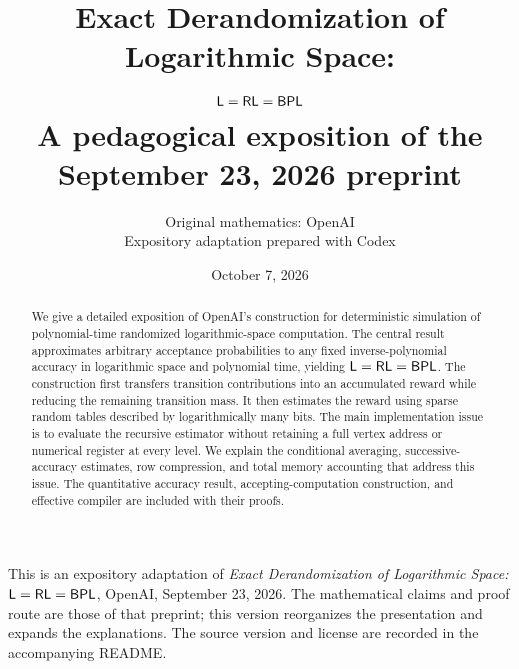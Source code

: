 \documentclass[11pt]{article}
\title{Exact Derandomization of Logarithmic Space:\protect\\
 $\mathsf L=\mathsf{RL}=\mathsf{BPL}$\protect\\[6pt]
 \large A pedagogical exposition of the September 23, 2026 preprint}
\author{Original mathematics: OpenAI\\[3pt]\normalsize Expository adaptation prepared with Codex}
\date{October 7, 2026}
\begin{document}
\maketitle
\begin{abstract}
We give a detailed exposition of OpenAI's construction for deterministic simulation of polynomial-time randomized logarithmic-space computation. The central result approximates arbitrary acceptance probabilities to any fixed inverse-polynomial accuracy in logarithmic space and polynomial time, yielding $\mathsf L=\mathsf{RL}=\mathsf{BPL}$. The construction first transfers transition contributions into an accumulated reward while reducing the remaining transition mass. It then estimates the reward using sparse random tables described by logarithmically many bits. The main implementation issue is to evaluate the recursive estimator without retaining a full vertex address or numerical register at every level. We explain the conditional averaging, successive-accuracy estimates, row compression, and total memory accounting that address this issue. The quantitative accuracy result, accepting-computation construction, and effective compiler are included with their proofs.
\end{abstract}

\begingroup\small
\noindent This is an expository adaptation of \emph{Exact Derandomization of Logarithmic Space: $\mathsf L=\mathsf{RL}=\mathsf{BPL}$}, OpenAI, September 23, 2026. The mathematical claims and proof route are those of that preprint; this version reorganizes the presentation and expands the explanations. The source version and license are recorded in the accompanying README.\par
\endgroup

\clearpage
\begingroup\small
\tableofcontents
\endgroup
\clearpage















\appendix






\end{document}

